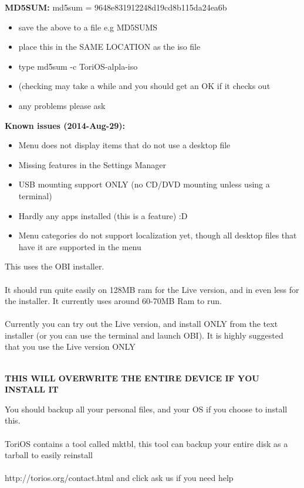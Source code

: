 \documentclass[12pt,a4paper]{book}
\begin{document}
\textbf{MD5SUM: } md5sum = 9648e831912248d19cd8b115da24ea6b \\ 
\begin{itemize}
\item{save the above to a file e.g MD5SUMS}
\item{place this in the SAME LOCATION as the iso file}
\item{type md5sum -c ToriOS-alpla-iso} 
\item({checking may take a while and you should get an OK if it checks out}
\item{any problems please ask}
\end{itemize}

\textbf{Known issues (2014-Aug-29):}
\begin{itemize}
\item{Menu does not display items that do not use a desktop file}  
\item{Missing features in the Settings Manager}
\item{USB mounting support ONLY (no CD/DVD mounting unless using a terminal)}
\item{Hardly any apps installed (this is a feature) :D}
\item{Menu categories do not support localization yet, though all desktop files that have it are supported in the menu}
\end{itemize}

This uses the OBI installer. \\ \\
It should run quite easily on 128MB ram for the Live version, and in even less for the installer.  It currently uses around 60-70MB Ram to run. \\ \\
Currently you can try out the Live version, and install ONLY from the text installer (or you can use the terminal and launch OBI).
It is highly suggested that you use the Live version ONLY \\ \\

\begin{center}

\textbf{THIS WILL OVERWRITE THE ENTIRE DEVICE IF YOU 
INSTALL IT} \\

\end{center}

You should backup all your  personal files, and your OS if you choose to install this.\\ \\
ToriOS contains a tool called mktbl, this tool can backup your entire disk as a tarball to easily reinstall \\ \\
http://torios.org/contact.html and click ask us if you need help \\
 
\end{document}
